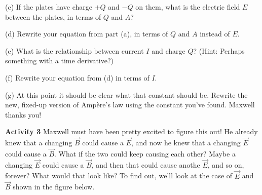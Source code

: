 (c) If the plates have charge $+Q$ and $-Q$ on them, what is the electric field $E$ between the plates, in terms of $Q$ and $A$?
\vspace{0.6in}

(d) Rewrite your equation from part (a), in terms of $Q$ and $A$ instead of $E$.
\vspace{0.5in}

(e) What is the relationship between current $I$ and charge $Q$? (Hint: Perhaps something with a time derivative?)
\vspace{0.5in}

(f) Rewrite your equation from (d) in terms of $I$.
\vspace{0.5in}

(g) At this point it should be clear what that constant should be.  Rewrite the new, fixed-up version of Amp\`ere's law using the constant you've found.  Maxwell thanks you!  
\vspace{0.5in}

\pagebreak
\textbf{Activity 3} \newline
Maxwell must have been pretty excited to figure this out!  He already knew that a changing $\vec B$ could cause a $\vec E$, and now he knew that a changing $\vec E$ could cause a $\vec B$.  What if the two could keep causing each other?  Maybe a changing $\vec E$ could cause a $\vec B$, and then that could cause anothe $\vec E$, and so on, forever?  What would that look like? To find out, we'll look at the case of $\vec E$ and $\vec B$ shown in the figure below.


